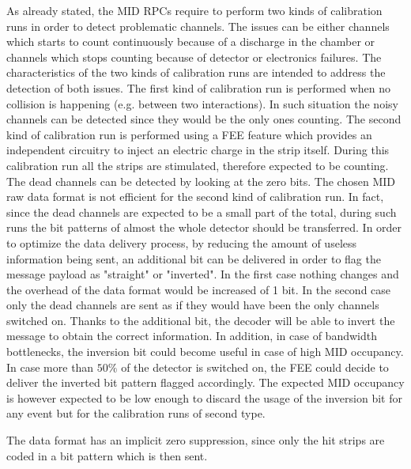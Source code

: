 As already stated, the MID RPCs require to perform two kinds of calibration runs in order to detect problematic channels.
The issues can be either channels which starts to count continuously because of a discharge in the chamber or channels which stops counting because of detector or electronics failures.
The characteristics of the two kinds of calibration runs are intended to address the detection of both issues.
The first kind of calibration run is performed when no collision is happening (e.g. between two interactions).
In such situation the noisy channels can be detected since they would be the only ones counting.
The second kind of calibration run is performed using a FEE feature which provides an independent circuitry to inject an electric charge in the strip itself.
During this calibration run all the strips are stimulated, therefore expected to be counting.
The dead channels can be detected by looking at the zero bits.
The chosen MID raw data format is not efficient for the second kind of calibration run.
In fact, since the dead channels are expected to be a small part of the total, during such runs the bit patterns of almost the whole detector should be transferred.
In order to optimize the data delivery process, by reducing the amount of useless information being sent, an additional bit can be delivered in order to flag the message payload as "straight" or "inverted".
In the first case nothing changes and the overhead of the data format would be increased of 1 bit.
In the second case only the dead channels are sent as if they would have been the only channels switched on.
Thanks to the additional bit, the decoder will be able to invert the message to obtain the correct information.
In addition, in case of bandwidth  bottlenecks, the inversion bit could become useful in case of high MID occupancy.
In case more than $50\%$ of the detector is switched on, the FEE could decide to deliver the inverted bit pattern flagged accordingly.
The expected MID occupancy is however expected to be low enough to discard the usage of the inversion bit for any event but for the calibration runs of second type.

The data format has an implicit zero suppression, since only the hit strips are coded in a bit pattern which is then sent.


